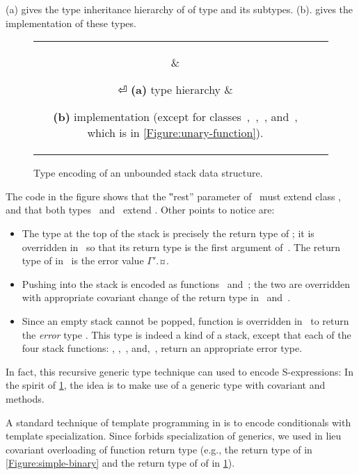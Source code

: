 (a) gives the type inheritance hierarchy of
of type  and its subtypes.
(b).
gives the implementation of these types.

\begin{figure}[!htb]
  \caption{Type encoding of an unbounded stack data structure.}
  \label{Figure:stack-encoding}
  \begin{tabular}{cc}
    \parbox[c]{0.3\linewidth}{%
      
    } &
    \hspace{-3ex} \parbox[c]{63ex}{}⏎
    \textbf{(a)} type hierarchy &
    \hspace{-3ex} \parbox[t]{63ex}{%
    \textbf{(b)} implementation (except
    for classes~,~,~, and~, which is in \cref{Figure:unary-function}).}
  \end{tabular}
\end{figure}

The code in the figure shows that the ‟rest” parameter of~ must extend class ,
  and that both types~ and~ extend .
Other points to notice are:
\begin{itemize}
  \item The type at the top of the stack is precisely the return type of ;
        it is overridden in~ so that its return type is the first argument of~.
        The return type of  in~ is the error value {$Γ'$.¤}.
  \item Pushing into the stack is encoded as functions~ and~;
        the two are overridden with appropriate covariant change of the return type in~ and~.
  \item Since an empty stack cannot be popped, function  is overridden in~ to return
    the \emph{error} type . This type is indeed a kind of a stack, except that each of the four stack
        functions: , ,~, and,~, return an appropriate error type.
\end{itemize}
In fact, this recursive generic type technique can used to encode S-expressions: In the spirit of
  \cref{Figure:stack-encoding}, the idea is to make use of a  generic type
  with covariant  and  methods.

A standard technique of template programming in \CC is to encode conditionals with template specialization.
Since \Java forbids specialization of generics, we used in lieu covariant overloading of function
  return type (e.g., the return type of  in \cref{Figure:simple-binary} and the
  return type of of  in \cref{Figure:stack-encoding}).

